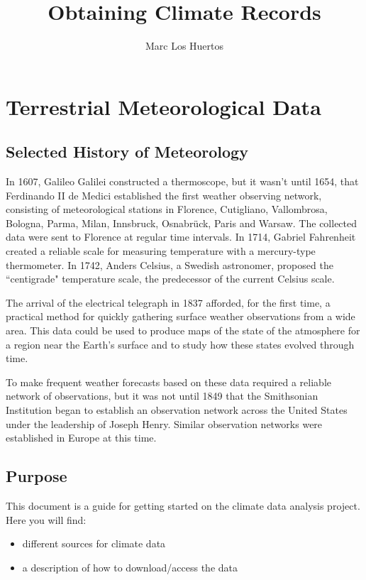 \documentclass{article}\usepackage[]{graphicx}\usepackage[]{color}
\title{Obtaining Climate Records}
\author{Marc Los Huertos}
\begin{document}
\maketitle

\section{Terrestrial Meteorological Data}

\subsection{Selected History of Meteorology}

In 1607, Galileo Galilei constructed a thermoscope, but it wasn't until 1654, that Ferdinando II de Medici established the first weather observing network, consisting of meteorological stations in Florence, Cutigliano, Vallombrosa, Bologna, Parma, Milan, Innsbruck, Osnabrück, Paris and Warsaw. The collected data were sent to Florence at regular time intervals. In 1714, Gabriel Fahrenheit created a reliable scale for measuring temperature with a mercury-type thermometer. In 1742, Anders Celsius, a Swedish astronomer, proposed the ``centigrade" temperature scale, the predecessor of the current Celsius scale.

The arrival of the electrical telegraph in 1837 afforded, for the first time, a practical method for quickly gathering surface weather observations from a wide area. This data could be used to produce maps of the state of the atmosphere for a region near the Earth's surface and to study how these states evolved through time. 

To make frequent weather forecasts based on these data required a reliable network of observations, but it was not until 1849 that the Smithsonian Institution began to establish an observation network across the United States under the leadership of Joseph Henry. Similar observation networks were established in Europe at this time. 

\subsection{Purpose}
This document is a guide for getting started on the climate data analysis project. Here you will find: 
\begin{itemize}
\item different sources for climate data
\item a description of how to download/access the data
\end{itemize}
\end{document}
